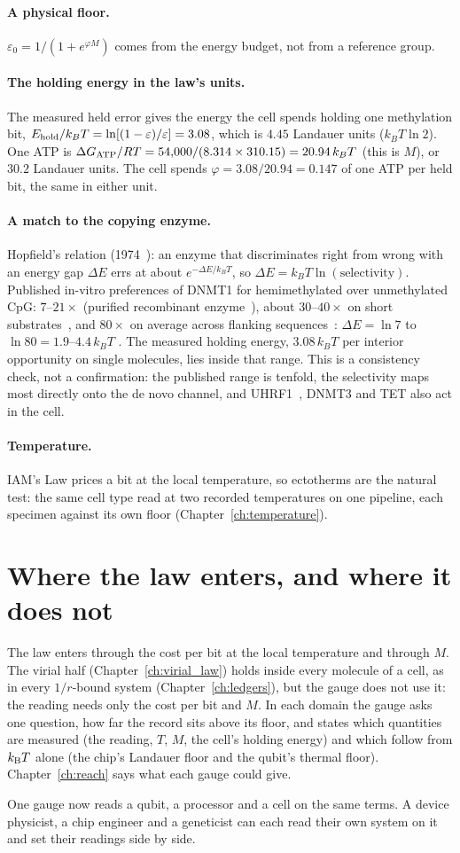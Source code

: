 \paragraph{A physical floor.} $\varepsilon_0=1/(1+e^{\varphi M})$ comes from the energy budget, not from a reference group.
\paragraph{The holding energy in the law's units.} The measured held error gives the energy the cell spends holding one methylation bit,
$E_{\rm hold}/k_BT=\ln[(1-\varepsilon)/\varepsilon]=3.08$, which is $4.45$ Landauer units ($k_BT\ln2$). One ATP is $\Delta G_{\rm ATP}/RT=
54{,}000/(8.314\times310.15)=20.94\,k_BT$ (this is $M$), or $30.2$ Landauer units. The cell spends $\varphi=3.08/20.94=0.147$ of one ATP per held
bit, the same in either unit.
\paragraph{A match to the copying enzyme.} Hopfield's relation (1974~\cite{Hopfield1974}): an enzyme that discriminates right from wrong with an energy gap $\Delta E$
errs at about $e^{-\Delta E/k_BT}$, so $\Delta E=k_BT\ln(\text{selectivity})$. Published in-vitro preferences of DNMT1 for hemimethylated over
unmethylated CpG: $7$--$21\times$ (purified recombinant enzyme~\cite{Pradhan1999}), about $30$--$40\times$ on short substrates~\cite{Goyal2006}, and $80\times$ on average across
flanking sequences~\cite{Adam2023}:
$\Delta E=\ln7$ to $\ln80=1.9$--$4.4\,k_BT$ \observed. The measured holding energy, $3.08\,k_BT$ per interior opportunity on single molecules,
lies inside that range. This is a consistency check, not a confirmation: the published range is tenfold, the selectivity maps most
directly onto the de novo channel, and UHRF1~\cite{Bostick2007,Sharif2007}, DNMT3 and TET also act in the cell.
\paragraph{Temperature.}\label{sec:og_temperature} IAM's Law prices a bit at the local temperature, so ectotherms are the natural test: the same cell type read at two recorded
temperatures on one pipeline, each specimen against its own floor (Chapter~\ref{ch:temperature}). \prediction

\section{Where the law enters, and where it does not}
The law enters through the cost per bit at the local temperature and through $M$. The virial half (Chapter~\ref{ch:virial_law}) holds inside every
molecule of a cell, as in every $1/r$-bound system (Chapter~\ref{ch:ledgers}), but the gauge does not use it: the reading needs only the cost per bit and
$M$. In each domain the gauge asks one question, how far the record sits above its floor, and states which quantities are measured (the reading,
$T$, $M$, the cell's holding energy) and which follow from $k_{\mathrm B} T$ alone (the chip's Landauer floor and the qubit's thermal floor). Chapter~\ref{ch:reach} says what each gauge could give.

One gauge now reads a qubit, a processor and a cell on the same terms. A device physicist, a chip engineer and a geneticist can each read their own system on it and set their readings side by side.
